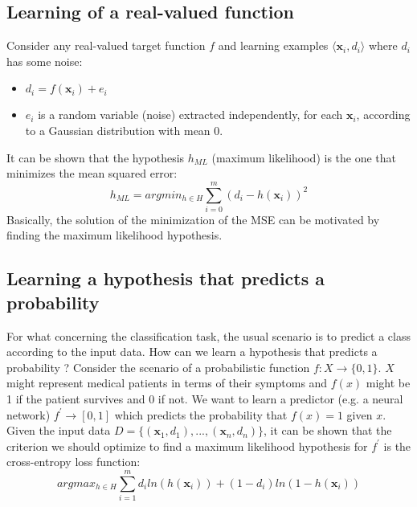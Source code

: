 \subsection{Learning of a real-valued function}
Consider any real-valued target function $f$ and learning examples $\langle 
 \textbf{x}_{i}, d_{i}\rangle$ where $d_{i}$ has some noise:
 \begin{itemize}
     \item $d_{i} = f(\textbf{x}_{i}) + e_{i}$
     \item $e_{i}$ is a random variable (noise) extracted independently, for each $\textbf{x}_{i}$, according to a Gaussian distribution with mean 0.
 \end{itemize}
 It can be shown that the hypothesis $h_{ML}$ (maximum likelihood) is the one that minimizes the mean squared error:
 \[h_{ML} = argmin_{h \in H} \sum_{i=0}^{m}(d_{i} - h(\textbf{x}_{i}))^{2}\]
 Basically, the solution of the minimization of the MSE can be motivated by finding the maximum likelihood hypothesis.

\subsection{Learning a hypothesis that predicts a probability}
For what concerning the classification task, the usual scenario is to predict a class according to the input data. How can we learn a hypothesis that predicts a probability ? \newline\newline
Consider the scenario of a probabilistic function $f: X \rightarrow \{0, 1\}$. $X$ might represent medical patients in terms of their symptoms and $f(x)$ might be 1 if the patient survives and 0 if not. We want to learn a predictor (e.g. a neural network) $f^{'} \rightarrow [0, 1]$ which predicts the probability that $f(x) = 1$ given $x$.\newline\newline
Given the input data $D = \{(\textbf{x}_{1}, d_{1}), ..., (\textbf{x}_{n}, d_{n})\}$, it can be shown that the criterion we should optimize to find a maximum likelihood hypothesis for $f^{'}$ is the cross-entropy loss function:
\[argmax_{h \in H} \sum_{i = 1}^{m} d_{i} ln(h(\textbf{x}_{i})) + (1 - d_{i}) ln(1 - h(\textbf{x}_{i}))\]

